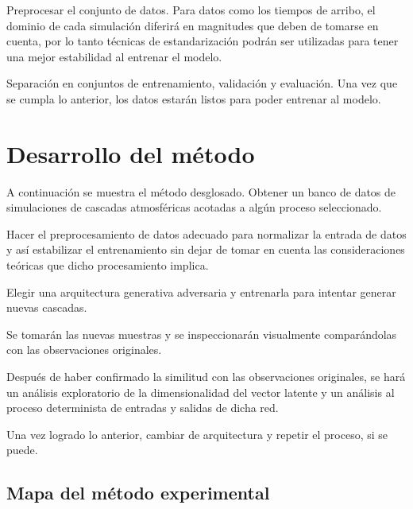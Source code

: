 Preprocesar el conjunto de datos.
Para datos como los tiempos de arribo, el dominio de cada simulación diferirá en magnitudes que deben de tomarse en cuenta, por lo tanto técnicas de estandarización podrán ser utilizadas para tener una mejor estabilidad al entrenar el modelo. 

Separación en conjuntos de entrenamiento, validación y evaluación. 
Una vez que se cumpla lo anterior, los datos estarán listos para poder entrenar al modelo.

\section{Desarrollo del método}

A continuación se muestra el método desglosado. 
Obtener un banco de datos de simulaciones de cascadas atmosféricas acotadas a algún proceso seleccionado.

Hacer el preprocesamiento de datos adecuado para normalizar la entrada de datos y así estabilizar el entrenamiento sin dejar de tomar en cuenta las consideraciones teóricas que dicho procesamiento implica.

Elegir una arquitectura generativa adversaria y entrenarla para intentar generar nuevas cascadas.

Se tomarán las nuevas muestras y se inspeccionarán visualmente comparándolas con las observaciones originales.

Después de haber confirmado la similitud con las observaciones originales, se hará un análisis exploratorio de la dimensionalidad del vector latente y un análisis al proceso determinista de entradas y salidas de dicha red. 

Una vez logrado lo anterior, cambiar de arquitectura y repetir el proceso, si se puede.

\subsection{Mapa del método experimental}